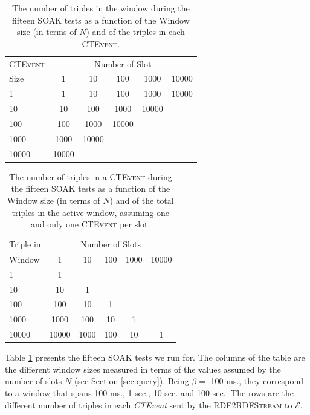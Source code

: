 \begin{table}[htb]
\centering
\small
 \begin{tabular}{l| ccccc}
	  	\hline
		\textsc{CTEvent}  &\multicolumn{5}{c}{Number of Slot}  \\
		Size  & 1 & 10 & 100 & 1000&10000 \\
		\hline	
		1 & 1& 10 & 100 & 1000&10000 \\
		10  & 10 & 100 & 1000&10000 \\
		100 & 100&1000&10000  \\
		1000 &1000 & 10000 \\
		10000&10000  \\
		\hline 
	\end{tabular}
	 \vspace{10pt}
	\caption[SOAK Tests Summary Table]{The number of triples in the window during the fifteen SOAK tests as a function of the Window size (in terms of $N$) and of the triples in each \textsc{CTEvent}.}
	\label{tab:soaktests}
\end{table}

\begin{table}[htb]
	\centering
	\small
	\begin{tabular}{l | ccccc} %
	  	\hline
		Triple in & \multicolumn{5}{c}{Number of Slots}  \\
		Window  & 1 & 10 & 100 & 1000&10000\\
		\hline
		1  	 & 1\\
		10   & 10  & 1 \\
		100  & 100 & 10 & 1\\
		1000 & 1000& 100& 10& 1\\
		10000& 10000 & 1000& 100& 10& 1\\
		\hline %
	 \end{tabular}
	\caption[SOAK Tests Summary Table Alternative Layout]{The number of triples in a \textsc{CTEvent} during the fifteen SOAK tests as a function of the Window size (in terms of $N$) and of the total triples in the active window, assuming one and only one \textsc{CTEvent} per slot.}
	\label{tab:soaktests-alt}
\end{table}

Table \ref{tab:soaktests} presents the fifteen SOAK tests we run for. The columns of the table are the different window sizes measured in terms of the values assumed by the number of slots $N$ (see Section \ref{sec:query}).  Being $\beta=$ 100 ms., they correspond to a window that spans 100 ms., 1 sec., 10 sec. and 100 sec.. The rows are the different number of triples in each \textit{CTEvent} sent by the \textsc{RDF2RDFStream} to $\mathcal{E}$.%


